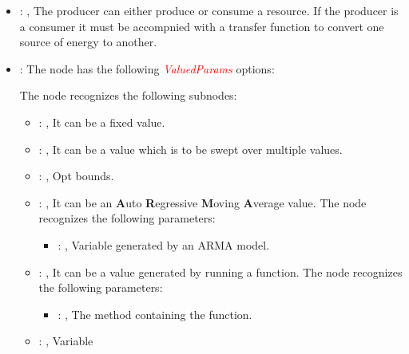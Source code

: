 \begin{itemize}
\begin{itemize}
        \item {}: , 
          The producer can either produce or consume a resource. If the producer is a consumer it
          must be accompnied with a transfer function to convert one source of energy to another.

        \item {}:
          The node  has the following \textcolor{red}{\textit{ValuedParams}}
          options:

          The  node recognizes the following subnodes:
          \begin{itemize}
            \item {}: , 
              It can be a fixed value.

            \item {}: , 
              It can be a value which is to be swept over multiple values.

            \item {}: , 
              Opt bounds.

            \item {}: , 
              It can be an \textbf{A}uto \textbf{R}egressive \textbf{M}oving \textbf{A}verage value.
              The  node recognizes the following parameters:
                \begin{itemize}
                  \item {}: , 
                    Variable generated by an ARMA model.
              \end{itemize}

            \item {}: , 
              It can be a value generated by running a function.
              The  node recognizes the following parameters:
                \begin{itemize}
                  \item {}: , 
                    The method containing the function.
              \end{itemize}

            \item {}: , 
              Variable


\end{itemize}
\end{itemize}
\end{itemize}
